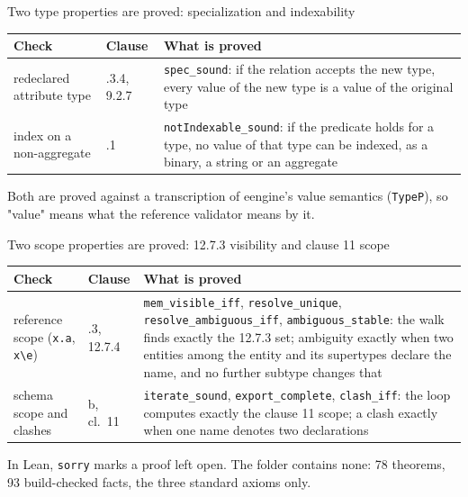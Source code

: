 \documentclass[11pt]{beamer}
\newcommand{\code}[1]{\texttt{#1}}
\begin{document}
\begin{frame}{Two type properties are proved: specialization and indexability}
  \setlength{\tabcolsep}{4pt}
  \begin{tabular}{@{}>{\raggedright\arraybackslash}p{3.0cm}>{\raggedright\arraybackslash}p{1.9cm}>{\raggedright\arraybackslash}p{5.1cm}@{}}
    \toprule
    \textbf{Check} & \textbf{Clause} & \textbf{What is proved} \\
    \midrule
    redeclared attribute type & 9.2.3.4, 9.2.7 & \code{spec\_sound}: if the relation accepts the new type, every value of the new type is a value of the original type \\[4pt]
    index on a non-aggregate & 12.6.1 & \code{notIndexable\_sound}: if the predicate holds for a type, no value of that type can be indexed, as a binary, a string or an aggregate \\
    \bottomrule
  \end{tabular}
  \medskip

  Both are proved against a transcription of eengine's value semantics
  (\code{TypeP}), so "value" means what the reference validator means by it.
\end{frame}

\begin{frame}{Two scope properties are proved: 12.7.3 visibility and clause 11 scope}
  \setlength{\tabcolsep}{3pt}
  \begin{tabular}{@{}>{\raggedright\arraybackslash}p{2.5cm}>{\raggedright\arraybackslash}p{1.8cm}>{\raggedright\arraybackslash}p{5.9cm}@{}}
    \toprule
    \textbf{Check} & \textbf{Clause} & \textbf{What is proved} \\
    \midrule
    reference scope (\code{x.a}, \code{x\textbackslash e}) & 12.7.3, 12.7.4 & \code{mem\_visible\_iff}, \code{resolve\_unique}, \code{resolve\_ambiguous\_iff}, \code{ambiguous\_stable}: the walk finds exactly the 12.7.3 set; ambiguity exactly when two entities among the entity and its supertypes declare the name, and no further subtype changes that \\[4pt]
    schema scope and clashes & 10.1 b, cl.\ 11 & \code{iterate\_sound}, \code{export\_complete}, \code{clash\_iff}: the loop computes exactly the clause 11 scope; a clash exactly when one name denotes two declarations \\
    \bottomrule
  \end{tabular}
  \medskip

  \footnotesize\color{sc4grey}
  In Lean, \code{sorry} marks a proof left open. The folder contains none: 78 theorems,
  93 build-checked facts, the three standard axioms only.
\end{frame}
\end{document}
